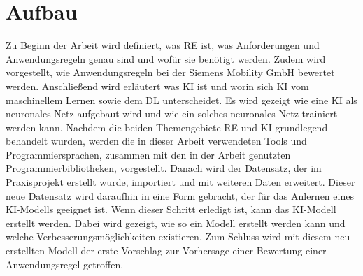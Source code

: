 \section{Aufbau}
Zu Beginn der Arbeit wird definiert, was \ac{RE} ist, was Anforderungen und Anwendungsregeln genau sind und wofür sie benötigt werden. Zudem wird vorgestellt,
wie Anwendungsregeln bei der Siemens Mobility GmbH bewertet werden. Anschließend wird erläutert was \ac{KI} ist und worin sich \ac{KI} vom maschinellem Lernen sowie dem \ac{DL}
unterscheidet. Es wird gezeigt wie eine \ac{KI} als neuronales Netz aufgebaut wird und wie ein solches neuronales Netz trainiert werden kann. 
Nachdem die beiden Themengebiete \ac{RE} und \ac{KI} grundlegend behandelt wurden, werden die in dieser Arbeit verwendeten Tools und Programmiersprachen,
zusammen mit den in der Arbeit genutzten Programmierbibliotheken, vorgestellt. Danach wird der Datensatz, der im Praxisprojekt erstellt wurde, importiert
und mit weiteren Daten erweitert. Dieser neue Datensatz wird daraufhin in eine Form gebracht, der für das Anlernen eines \ac{KI}-Modells geeignet ist.
Wenn dieser Schritt erledigt ist, kann das \ac{KI}-Modell erstellt werden. Dabei wird gezeigt, wie so ein Modell erstellt werden kann und welche 
Verbesserungsmöglichkeiten existieren. Zum Schluss wird mit diesem neu erstellten Modell der erste Vorschlag zur Vorhersage einer Bewertung einer Anwendungsregel getroffen.
